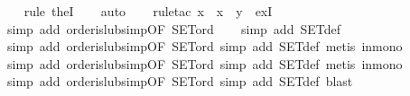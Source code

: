 \begin{isabellebody}
\ \ \isamarkupfalse%
\ {}rule\ the{}I{}{}\isanewline
\ \ \isamarkupfalse%
\ auto\isanewline
\ \ \isamarkupfalse%
\ {}rule{}tac\ x\ {}\ {}x\ {}\ y{}\ \ exI{}\isanewline
\ \ \isamarkupfalse%
\ {}simp\ add{}\ order{}is{}lub{}simp{}OF\ SET{}ord{}{}\isanewline
\ \ \isamarkupfalse%
\ {}simp\ add{}\ SET{}def{}\isanewline
\ \ \isamarkupfalse%
\ {}simp\ add{}\ order{}is{}lub{}simp{}OF\ SET{}ord{}{}\ simp\ add{}\ SET{}def{}\ metis\ in{}mono{}\isanewline
\ \ \isamarkupfalse%
\ {}simp\ add{}\ order{}is{}lub{}simp{}OF\ SET{}ord{}{}\ simp\ add{}\ SET{}def{}\ metis\ in{}mono{}\isanewline
\ \ \isamarkupfalse%
\ {}simp\ add{}\ order{}is{}lub{}simp{}OF\ SET{}ord{}{}\ simp\ add{}\ SET{}def{}\ blast{}\isanewline

\end{isabellebody}
